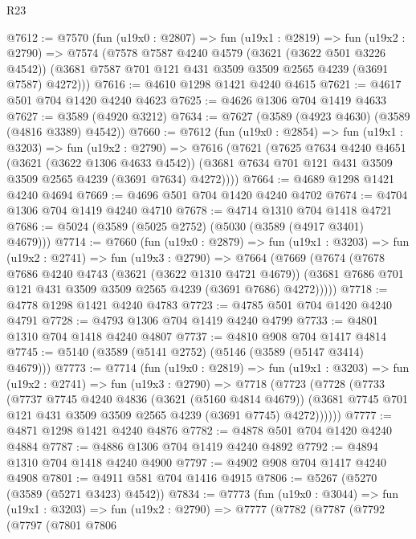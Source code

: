 \begin{lexlean}{R23}
\begin{coremodule}
@7612 := @7570
    (fun (u19x0 : @2807) =>
    fun (u19x1 : @2819) =>
    fun (u19x2 : @2790) =>
    @7574
      (@7578
        @7587
        @4240
        @4579
        (@3621 (@3622 @501 @3226 @4542))
        (@3681 @7587 @701 @121 @431 @3509 @3509 @2565 @4239 (@3691 @7587) @4272)))
@7616 := @4610 @1298 @1421 @4240 @4615
@7621 := @4617 @501 @704 @1420 @4240 @4623
@7625 := @4626 @1306 @704 @1419 @4633
@7627 := @3589 (@4920 @3212)
@7634 := @7627 (@3589 (@4923 @4630) (@3589 (@4816 @3389) @4542))
@7660 := @7612
    (fun (u19x0 : @2854) =>
    fun (u19x1 : @3203) =>
    fun (u19x2 : @2790) =>
    @7616
      (@7621
        (@7625
          @7634
          @4240
          @4651
          (@3621 (@3622 @1306 @4633 @4542))
          (@3681 @7634 @701 @121 @431 @3509 @3509 @2565 @4239 (@3691 @7634) @4272))))
@7664 := @4689 @1298 @1421 @4240 @4694
@7669 := @4696 @501 @704 @1420 @4240 @4702
@7674 := @4704 @1306 @704 @1419 @4240 @4710
@7678 := @4714 @1310 @704 @1418 @4721
@7686 := @5024 (@3589 (@5025 @2752) (@5030 (@3589 (@4917 @3401) @4679)))
@7714 := @7660
    (fun (u19x0 : @2879) =>
    fun (u19x1 : @3203) =>
    fun (u19x2 : @2741) =>
    fun (u19x3 : @2790) =>
    @7664
      (@7669
        (@7674
          (@7678
            @7686
            @4240
            @4743
            (@3621 (@3622 @1310 @4721 @4679))
            (@3681 @7686 @701 @121 @431 @3509 @3509 @2565 @4239 (@3691 @7686) @4272)))))
@7718 := @4778 @1298 @1421 @4240 @4783
@7723 := @4785 @501 @704 @1420 @4240 @4791
@7728 := @4793 @1306 @704 @1419 @4240 @4799
@7733 := @4801 @1310 @704 @1418 @4240 @4807
@7737 := @4810 @908 @704 @1417 @4814
@7745 := @5140 (@3589 (@5141 @2752) (@5146 (@3589 (@5147 @3414) @4679)))
@7773 := @7714
    (fun (u19x0 : @2819) =>
    fun (u19x1 : @3203) =>
    fun (u19x2 : @2741) =>
    fun (u19x3 : @2790) =>
    @7718
      (@7723
        (@7728
          (@7733
            (@7737
              @7745
              @4240
              @4836
              (@3621 (@5160 @4814 @4679))
              (@3681 @7745 @701 @121 @431 @3509 @3509 @2565 @4239 (@3691 @7745) @4272))))))
@7777 := @4871 @1298 @1421 @4240 @4876
@7782 := @4878 @501 @704 @1420 @4240 @4884
@7787 := @4886 @1306 @704 @1419 @4240 @4892
@7792 := @4894 @1310 @704 @1418 @4240 @4900
@7797 := @4902 @908 @704 @1417 @4240 @4908
@7801 := @4911 @581 @704 @1416 @4915
@7806 := @5267 (@5270 (@3589 (@5271 @3423) @4542))
@7834 := @7773
    (fun (u19x0 : @3044) =>
    fun (u19x1 : @3203) =>
    fun (u19x2 : @2790) =>
    @7777
      (@7782
        (@7787
          (@7792
            (@7797
              (@7801
                @7806

\end{coremodule}
\end{lexlean}
